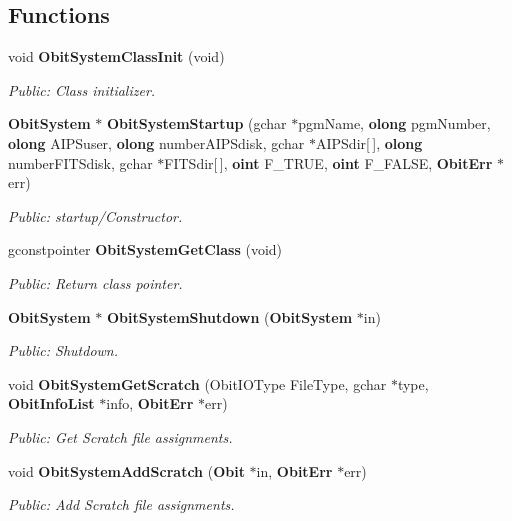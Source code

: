 \subsection*{Functions}
\begin{CompactItemize}
\item 
void {\bf Obit\-System\-Class\-Init} (void)
\begin{CompactList}\small\item\em Public: Class initializer. \item\end{CompactList}\item 
{\bf Obit\-System} $\ast$ {\bf Obit\-System\-Startup} (gchar $\ast$pgm\-Name, {\bf olong} pgm\-Number, {\bf olong} AIPSuser, {\bf olong} number\-AIPSdisk, gchar $\ast$AIPSdir[$\,$], {\bf olong} number\-FITSdisk, gchar $\ast$FITSdir[$\,$], {\bf oint} F\_\-TRUE, {\bf oint} F\_\-FALSE, {\bf Obit\-Err} $\ast$err)
\begin{CompactList}\small\item\em Public: startup/Constructor. \item\end{CompactList}\item 
gconstpointer {\bf Obit\-System\-Get\-Class} (void)
\begin{CompactList}\small\item\em Public: Return class pointer. \item\end{CompactList}\item 
{\bf Obit\-System} $\ast$ {\bf Obit\-System\-Shutdown} ({\bf Obit\-System} $\ast$in)
\begin{CompactList}\small\item\em Public: Shutdown. \item\end{CompactList}\item 
void {\bf Obit\-System\-Get\-Scratch} (Obit\-IOType File\-Type, gchar $\ast$type, {\bf Obit\-Info\-List} $\ast$info, {\bf Obit\-Err} $\ast$err)
\begin{CompactList}\small\item\em Public: Get Scratch file assignments. \item\end{CompactList}\item 
void {\bf Obit\-System\-Add\-Scratch} ({\bf Obit} $\ast$in, {\bf Obit\-Err} $\ast$err)
\begin{CompactList}\small\item\em Public: Add Scratch file assignments. \item\end{CompactList}\item 

\end{CompactItemize}
